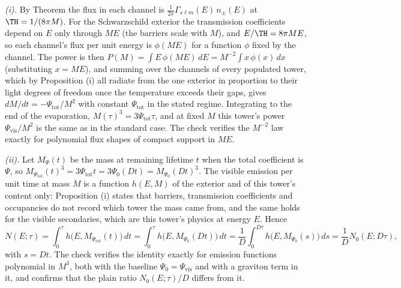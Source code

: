 \emph{(i).} By Theorem  the flux in each channel is $\frac{1}{2\pi}\Gamma_{s\ell m}(E)\,n_{\pm}(E)$ at $\TH = 1/(8\pi M)$. For the Schwarzschild exterior the transmission coefficients depend on $E$ only through $ME$ (the barriers scale with $M$), and $E/\TH = 8\pi ME$, so each channel's flux per unit energy is $\phi(ME)$ for a function $\phi$ fixed by the channel. The power is then $P(M) = \int E\,\phi(ME)\,dE = M^{-2}\int x\,\phi(x)\,dx$ (substituting $x = ME$), and summing over the channels of every populated tower, which by Proposition (i) all radiate from the one exterior in proportion to their light degrees of freedom once the temperature exceeds their gaps, gives $dM/dt = -\Psi_{\mathrm{tot}}/M^{2}$ with constant $\Psi_{\mathrm{tot}}$ in the stated regime. Integrating to the end of the evaporation, $M(\tau)^{3} = 3\Psi_{\mathrm{tot}}\tau$, and at fixed $M$ this tower's power $\Psi_{\mathrm{vis}}/M^{2}$ is the same as in the standard case. The check verifies the $M^{-2}$ law exactly for polynomial flux shapes of compact support in $ME$.

\emph{(ii).} Let $M_{\Psi}(t)$ be the mass at remaining lifetime $t$ when the total coefficient is $\Psi$, so $M_{\Psi_{\mathrm{tot}}}(t)^{3} = 3\Psi_{\mathrm{tot}}t = 3\Psi_{0}(Dt) = M_{\Psi_{0}}(Dt)^{3}$. The visible emission per unit time at mass $M$ is a function $h(E, M)$ of the exterior and of this tower's content only: Proposition (i) states that barriers, transmission coefficients and occupancies do not record which tower the mass came from, and the same holds for the visible secondaries, which are this tower's physics at energy $E$. Hence
\[
N(E;\tau) = \int_{0}^{\tau} h\bigl(E, M_{\Psi_{\mathrm{tot}}}(t)\bigr)\,dt = \int_{0}^{\tau} h\bigl(E, M_{\Psi_{0}}(Dt)\bigr)\,dt = \frac{1}{D}\int_{0}^{D\tau} h\bigl(E, M_{\Psi_{0}}(s)\bigr)\,ds = \frac{1}{D}N_{0}(E;D\tau),
\]
with $s = Dt$. The check verifies the identity exactly for emission functions polynomial in $M^{3}$, both with the baseline $\Psi_{0} = \Psi_{\mathrm{vis}}$ and with a graviton term in it, and confirms that the plain ratio $N_{0}(E;\tau)/D$ differs from it.

